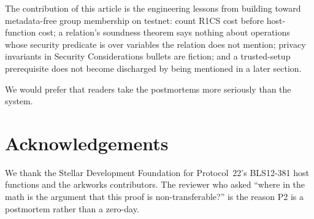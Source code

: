 \documentclass[journal]{IEEEtran}
\begin{document}
The contribution of this article is the engineering lessons from building toward metadata-free group membership on testnet: count R1CS cost before host-function cost; a relation's soundness theorem says nothing about operations whose security predicate is over variables the relation does not mention; privacy invariants in Security Considerations bullets are fiction; and a trusted-setup prerequisite does not become discharged by being mentioned in a later section.

We would prefer that readers take the postmortems more seriously than the system.

\section*{Acknowledgements}

We thank the Stellar Development Foundation for Protocol~22's BLS12-381 host functions and the arkworks contributors. The reviewer who asked ``where in the math is the argument that this proof is non-transferable?'' is the reason P2 is a postmortem rather than a zero-day.
\end{document}
